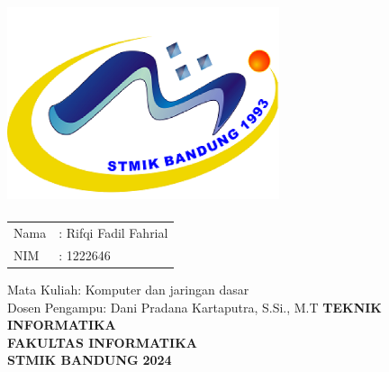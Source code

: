 \begin{spacing}{1}
  \maketitle
  \thispagestyle{empty}
  \begin{center}
  \includegraphics[width=8cm,height=6cm]{./images/logo.png}
  \end{center}
  \vspace{0.5 cm}
  \begin{center}
  \begin{tabular}{ll}
  Nama & : Rifqi Fadil Fahrial \\
  NIM & : 1222646\\
  \end{tabular}
  \newline
  \linebreak
  \linebreak
  Mata Kuliah: Komputer dan jaringan dasar\\
  Dosen Pengampu: Dani Pradana Kartaputra, S.Si., M.T\linebreak
  \newline
  \newline
  \newline
  \newline
  \textbf {TEKNIK INFORMATIKA} \\
  \textbf {FAKULTAS INFORMATIKA} \\
  \textbf {STMIK BANDUNG}
  \linebreak
  \textbf {2024} \linebreak
  \end{center}
\end{spacing}
\pagebreak
